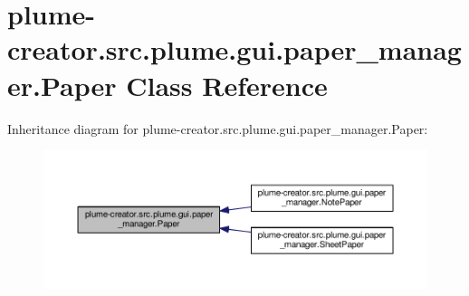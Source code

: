 \hypertarget{classplume-creator_1_1src_1_1plume_1_1gui_1_1paper__manager_1_1_paper}{}\section{plume-\/creator.src.\+plume.\+gui.\+paper\+\_\+manager.\+Paper Class Reference}
\label{classplume-creator_1_1src_1_1plume_1_1gui_1_1paper__manager_1_1_paper}


Inheritance diagram for plume-\/creator.src.\+plume.\+gui.\+paper\+\_\+manager.\+Paper\+:\nopagebreak
\begin{figure}[H]
\begin{center}
\leavevmode
\includegraphics[width=350pt]{classplume-creator_1_1src_1_1plume_1_1gui_1_1paper__manager_1_1_paper__inherit__graph}
\end{center}
\end{figure}
